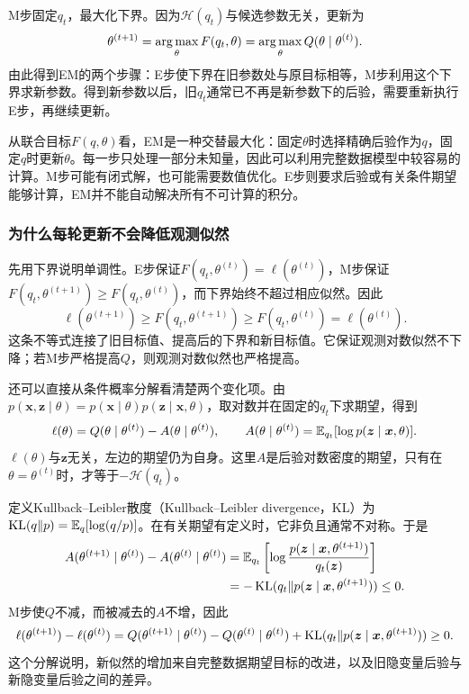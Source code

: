 M步固定$q_t$，最大化下界。因为$\mathcal H(q_t)$与候选参数无关，更新为
\begin{equation}
 \theta^{(t+1)}=\mathop{\mathrm{arg\,max}}_\theta F(q_t,\theta)
 =\mathop{\mathrm{arg\,max}}_\theta Q(\theta\mid\theta^{(t)}).
 \label{eq:solving-em-m}
\end{equation}
由此得到EM的两个步骤：E步使下界在旧参数处与原目标相等，M步利用这个下界求新参数。得到新参数以后，旧$q_t$通常已不再是新参数下的后验，需要重新执行E步，再继续更新。

从联合目标$F(q,\theta)$看，EM是一种交替最大化：固定$\theta$时选择精确后验作为$q$，固定$q$时更新$\theta$。每一步只处理一部分未知量，因此可以利用完整数据模型中较容易的计算。M步可能有闭式解，也可能需要数值优化。E步则要求后验或有关条件期望能够计算，EM并不能自动解决所有不可计算的积分。

\subsubsection{为什么每轮更新不会降低观测似然}
先用下界说明单调性。E步保证$F(q_t,\theta^{(t)})=\ell(\theta^{(t)})$，M步保证$F(q_t,\theta^{(t+1)})\geq F(q_t,\theta^{(t)})$，而下界始终不超过相应似然。因此
\begin{equation}
 \ell(\theta^{(t+1)})\geq F(q_t,\theta^{(t+1)})
 \geq F(q_t,\theta^{(t)})=\ell(\theta^{(t)}).
\end{equation}
这条不等式连接了旧目标值、提高后的下界和新目标值。它保证观测对数似然不下降；若M步严格提高$Q$，则观测对数似然也严格提高。

还可以直接从条件概率分解看清楚两个变化项。由$p(\bm x,\bm z\mid\theta)=p(\bm x\mid\theta)p(\bm z\mid\bm x,\theta)$，取对数并在固定的$q_t$下求期望，得到
\begin{equation}
 \ell(\theta)=Q(\theta\mid\theta^{(t)})-A(\theta\mid\theta^{(t)}),\qquad
 A(\theta\mid\theta^{(t)})=\mathbb{E}_{q_t}[\log p(\bm z\mid\bm x,\theta)].
\end{equation}
$\ell(\theta)$与$\bm z$无关，左边的期望仍为自身。这里$A$是后验对数密度的期望，只有在$\theta=\theta^{(t)}$时，才等于$-\mathcal H(q_t)$。

定义Kullback--Leibler散度（Kullback--Leibler divergence，KL）为$\operatorname{KL}(q\|p)=\mathbb{E}_q[\log(q/p)]$。在有关期望有定义时，它非负且通常不对称。于是
\begin{align}
 A(\theta^{(t+1)}\mid\theta^{(t)})-A(\theta^{(t)}\mid\theta^{(t)})
 &=\mathbb{E}_{q_t}\left[\log\frac{p(\bm z\mid\bm x,\theta^{(t+1)})}{q_t(\bm z)}\right]\\
 &=-\operatorname{KL}(q_t\|p(\bm z\mid\bm x,\theta^{(t+1)}))\leq0.
\end{align}
M步使$Q$不减，而被减去的$A$不增，因此
\begin{equation}
 \ell(\theta^{(t+1)})-\ell(\theta^{(t)})
 =Q(\theta^{(t+1)}\mid\theta^{(t)})-Q(\theta^{(t)}\mid\theta^{(t)})
 +\operatorname{KL}(q_t\|p(\bm z\mid\bm x,\theta^{(t+1)}))\geq0.
\end{equation}
这个分解说明，新似然的增加来自完整数据期望目标的改进，以及旧隐变量后验与新隐变量后验之间的差异。

